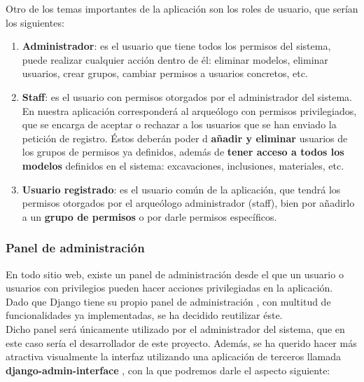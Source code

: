 Otro de los temas importantes de la aplicación son los roles de usuario, que serían los
siguientes:

    \begin{enumerate}
        \item \textbf{Administrador}: es el usuario que tiene todos los permisos del
        sistema, puede realizar cualquier acción dentro de él: eliminar modelos, eliminar
        usuarios, crear grupos, cambiar permisos a usuarios concretos, etc.
        \item \textbf{Staff}: es el usuario con permisos otorgados por el administrador
        del sistema. En nuestra aplicación corresponderá al arqueólogo con permisos
        privilegiados, que se encarga de aceptar o rechazar a los usuarios que se han
        enviado la petición de registro. Éstos deberán poder d \textbf{añadir y eliminar}
        usuarios de los grupos de permisos ya definidos, además de \textbf{tener acceso a
        todos los modelos} definidos en el sistema: excavaciones, inclusiones, materiales, etc.
        \item \textbf{Usuario registrado}: es el usuario común de la aplicación, que tendrá
        los permisos otorgados por el arqueólogo administrador (staff), bien por añadirlo
        a un \textbf{grupo de permisos} o por darle permisos específicos.
    \end{enumerate}

\subsubsection{Panel de administración}
En todo sitio web, existe un panel de administración desde el que un usuario o usuarios
con privilegios pueden hacer acciones privilegiadas en la aplicación. Dado que Django
tiene su propio panel de administración \cite{admin-panel}, con multitud de funcionalidades
ya implementadas, se ha decidido reutilizar éste.\\

Dicho panel será únicamente utilizado por el administrador del sistema, que en este caso
sería el desarrollador de este proyecto. Además, se ha querido hacer más atractiva
visualmente la interfaz utilizando una aplicación de terceros llamada
\textbf{django-admin-interface} \cite{admin-interface}, con la que podremos darle el
aspecto siguiente:

